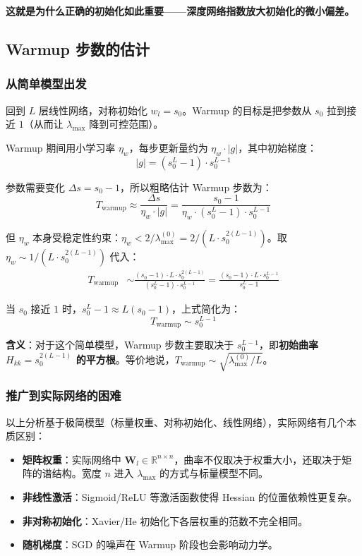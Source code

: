 \documentclass[12pt, a4paper]{ctexart}
\begin{document}
\textbf{这就是为什么正确的初始化如此重要——深度网络指数放大初始化的微小偏差。}

\subsection{Warmup 步数的估计}

\subsubsection{从简单模型出发}

回到 $L$ 层线性网络，对称初始化 $w_l = s_0$。Warmup 的目标是把参数从 $s_0$ 拉到接近 $1$（从而让 $\lambda_{\max}$ 降到可控范围）。

Warmup 期间用小学习率 $\eta_w$，每步更新量约为 $\eta_w \cdot |g|$，其中初始梯度：
\begin{equation}
    |g| = (s_0^L - 1) \cdot s_0^{L-1}
\end{equation}

参数需要变化 $\Delta s = s_0 - 1$，所以粗略估计 Warmup 步数为：
\begin{equation}
    T_{\text{warmup}} \approx \frac{\Delta s}{\eta_w \cdot |g|} = \frac{s_0 - 1}{\eta_w \cdot (s_0^L - 1) \cdot s_0^{L-1}}
\end{equation}

但 $\eta_w$ 本身受稳定性约束：$\eta_w < 2/\lambda_{\max}^{(0)} = 2/(L \cdot s_0^{2(L-1)})$。取 $\eta_w \sim 1/(L \cdot s_0^{2(L-1)})$ 代入：
\begin{align}
    T_{\text{warmup}} &\sim \frac{(s_0-1) \cdot L \cdot s_0^{2(L-1)}}{(s_0^L - 1) \cdot s_0^{L-1}} = \frac{(s_0-1) \cdot L \cdot s_0^{L-1}}{s_0^L - 1}
\end{align}

当 $s_0$ 接近 $1$ 时，$s_0^L - 1 \approx L(s_0-1)$，上式简化为：
\begin{equation}
    T_{\text{warmup}} \sim s_0^{L-1}
\end{equation}

\textbf{含义}：对于这个简单模型，Warmup 步数主要取决于 $s_0^{L-1}$，即\textbf{初始曲率 $H_{kk} = s_0^{2(L-1)}$ 的平方根}。等价地说，$T_{\text{warmup}} \sim \sqrt{\lambda_{\max}^{(0)}/L}$。

\subsubsection{推广到实际网络的困难}

以上分析基于极简模型（标量权重、对称初始化、线性网络），实际网络有几个本质区别：
\begin{itemize}
    \item \textbf{矩阵权重}：实际网络中 $\mathbf{W}_l \in \mathbb{R}^{n \times n}$，曲率不仅取决于权重大小，还取决于矩阵的谱结构。宽度 $n$ 进入 $\lambda_{\max}$ 的方式与标量模型不同。
    \item \textbf{非线性激活}：Sigmoid/ReLU 等激活函数使得 Hessian 的位置依赖性更复杂。
    \item \textbf{非对称初始化}：Xavier/He 初始化下各层权重的范数不完全相同。
    \item \textbf{随机梯度}：SGD 的噪声在 Warmup 阶段也会影响动力学。
\end{itemize}
\end{document}
